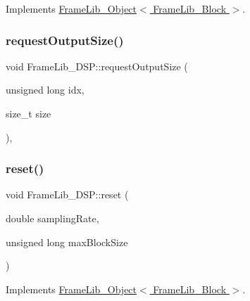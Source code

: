 Implements \hyperlink{class_frame_lib___object_abdfca6b259f5fc7f97f4f2e016c1d80f}{Frame\+Lib\+\_\+\+Object$<$ Frame\+Lib\+\_\+\+Block $>$}.

\mbox{\label{class_frame_lib___d_s_p_a018be5346f473c3c21d5251d6acb85c7}} 
\subsubsection{\texorpdfstring{request\+Output\+Size()}{requestOutputSize()}}
{\footnotesize\ttfamily void Frame\+Lib\+\_\+\+D\+S\+P\+::request\+Output\+Size (\begin{DoxyParamCaption}\item[{unsigned long}]{idx,  }\item[{size\+\_\+t}]{size }\end{DoxyParamCaption})\hspace{0.3cm}{\ttfamily [inline]}, {\ttfamily [protected]}}

\mbox{\label{class_frame_lib___d_s_p_ad253c096a1c7cc236804dfd1f2e650ec}} 
\subsubsection{\texorpdfstring{reset()}{reset()}}
{\footnotesize\ttfamily void Frame\+Lib\+\_\+\+D\+S\+P\+::reset (\begin{DoxyParamCaption}\item[{double}]{sampling\+Rate,  }\item[{unsigned long}]{max\+Block\+Size }\end{DoxyParamCaption})\hspace{0.3cm}{\ttfamily [virtual]}}



Implements \hyperlink{class_frame_lib___object_aeb02311ab422dd569aeb982e31a66893}{Frame\+Lib\+\_\+\+Object$<$ Frame\+Lib\+\_\+\+Block $>$}.

\mbox{\label{class_frame_lib___d_s_p_ad15333614446257796e75db254efac78}} 
